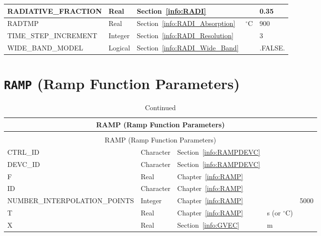 \documentclass[11pt]{book}
\begin{document}
\begin{longtable}{@{\extracolsep{\fill}}|l|l|l|l|l|}
{\ct RADIATIVE\_FRACTION}           & Real          & Section~\ref{info:RADI}                   &                   & 0.35              \\ \hline
{\ct RADTMP                   }     & Real          & Section~\ref{info:RADI_Absorption}        & $^\circ$C         & 900               \\ \hline
{\ct TIME\_STEP\_INCREMENT}         & Integer       & Section~\ref{info:RADI_Resolution}        &                   & 3                 \\ \hline
{\ct WIDE\_BAND\_MODEL    }         & Logical       & Section~\ref{info:RADI_Wide_Band}         &                   & {\ct .FALSE.}     \\ \hline
\end{longtable}

\vspace{\baselineskip}


\section{\texorpdfstring{{\tt RAMP}}{RAMP} (Ramp Function Parameters)}

\begin{longtable}{@{\extracolsep{\fill}}|l|l|l|l|l|}
\caption[Ramp function parameters ({\ct RAMP} namelist group)]{For more information see Chapter~\ref{info:RAMP}.}
\label{tbl:RAMP} \\
\hline
\multicolumn{5}{|c|}{{\ct RAMP} (Ramp Function Parameters)} \\
\hline \hline
\endfirsthead
\caption[]{Continued} \\
\hline
\multicolumn{5}{|c|}{{\ct RAMP} (Ramp Function Parameters)} \\
\hline \hline
\endhead
{\ct CTRL\_ID}                      & Character     & Section~\ref{info:RAMPDEVC}   &                       &           \\ \hline
{\ct DEVC\_ID}                      & Character     & Section~\ref{info:RAMPDEVC}   &                       &           \\ \hline
{\ct F}                             & Real          & Chapter~\ref{info:RAMP}       &                       &           \\ \hline
{\ct ID}                            & Character     & Chapter~\ref{info:RAMP}       &                       &           \\ \hline
{\ct NUMBER\_INTERPOLATION\_POINTS} & Integer       & Chapter~\ref{info:RAMP}       &                       &  5000     \\ \hline
{\ct T}                             & Real          & Chapter~\ref{info:RAMP}       & s (or $^\circ$C)      &           \\ \hline
{\ct X}                             & Real          & Section~\ref{info:GVEC}       & m                     &           \\ \hline
\end{longtable}
\end{document}
